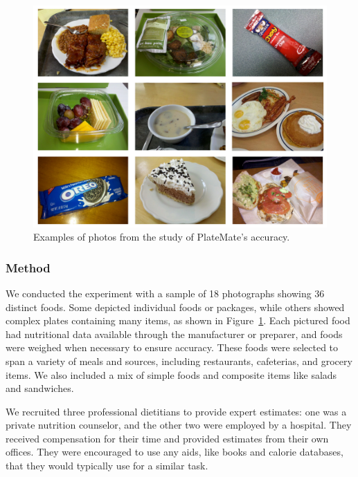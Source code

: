 \begin{figure}
\begin{center}
   \includegraphics[width=\columnwidth]{figs/groundtruth.pdf}
   \caption{Examples of photos from the study of PlateMate's accuracy.}
   \label{fig:groundTruth}
\end{center}
\end{figure}

\subsubsection{Method}
We conducted the experiment with a sample of 18 photographs showing 36 distinct foods. Some depicted individual foods or packages, while others showed complex plates containing many items, as shown in Figure~\ref{fig:groundTruth}.  Each pictured food had nutritional data available through the manufacturer or preparer, and foods were weighed when necessary to ensure accuracy. These foods were selected to span a variety of meals and sources, including restaurants, cafeterias, and grocery items.  We also included a mix of simple foods and composite items like salads and sandwiches.

We recruited three professional dietitians to provide expert estimates: one was a private nutrition counselor, and the other two were employed by a hospital. They received compensation for their time and provided estimates from their own offices. They were encouraged to use any aids, like books and calorie databases, that they would typically use for a similar task.


